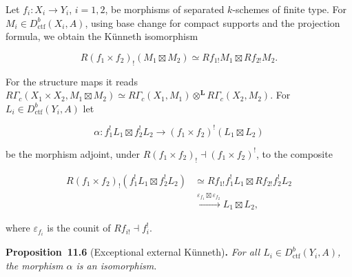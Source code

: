 \documentclass[11pt]{article}
\newenvironment{bpstatement}[2]{\par\addvspace{0.6\baselineskip}\noindent\textbf{#1}#2\textbf{.}\enspace\ignorespaces}
  {\par\addvspace{0.4\baselineskip}}
\newenvironment{bpstatementit}[2]{\begin{bpstatement}{#1}{#2}\itshape\ignorespaces}{\end{bpstatement}}
\begin{document}
Let \(f_i:X_i\to Y_i\), \(i=1,2\), be morphisms of separated \(k\)-schemes of finite type. For \(M_i\in D^b_{\mathrm{ctf}}(X_i,A)\), using base change for compact supports and the projection formula, we obtain the Künneth isomorphism

\[
R(f_1\times f_2)_!(M_1\boxtimes M_2)
\simeq Rf_{1!}M_1\boxtimes Rf_{2!}M_2.
\]

For the structure maps it reads \(R\Gamma_c(X_1\times X_2,M_1\boxtimes M_2)\simeq R\Gamma_c(X_1,M_1)\otimes^{\mathbf L} R\Gamma_c(X_2,M_2)\). For \(L_i\in D^b_{\mathrm{ctf}}(Y_i,A)\) let

\[
\alpha:f_1^!L_1\boxtimes f_2^!L_2\longrightarrow
(f_1\times f_2)^!(L_1\boxtimes L_2)
\]

be the morphism adjoint, under \(R(f_1\times f_2)_!\dashv(f_1\times f_2)^!\), to the composite

\[
\begin{aligned}
R(f_1\times f_2)_!(f_1^!L_1\boxtimes f_2^!L_2)
&\simeq Rf_{1!}f_1^!L_1\boxtimes Rf_{2!}f_2^!L_2\\
&\xrightarrow{\varepsilon_{f_1}\boxtimes\varepsilon_{f_2}}
L_1\boxtimes L_2,
\end{aligned}
\]

where \(\varepsilon_{f_i}\) is the counit of \(Rf_{i!}\dashv f_i^!\).

\label{bp19}%
\begin{bpstatementit}{Proposition~11.6}{ (Exceptional external Künneth)}
For all \(L_i\in D^b_{\mathrm{ctf}}(Y_i,A)\), the morphism \(\alpha\) is an isomorphism.
\end{bpstatementit}
\end{document}
